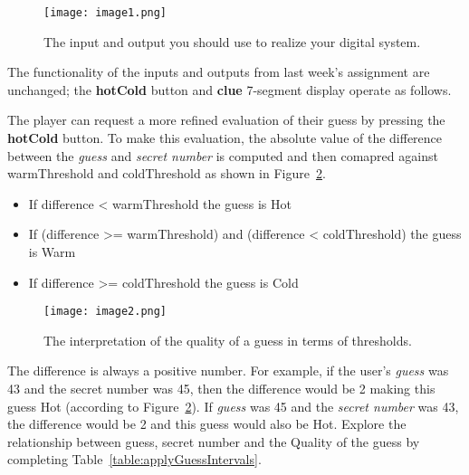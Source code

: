 \begin{figure}[ht]
\texttt{[image:  image1.png]}
\caption{The input and output you should use to realize your digital system.}
\label{fig:iOonDevBorad}
\end{figure}

The functionality of the inputs and outputs from last week's assignment
are unchanged; the \textbf{hotCold} button and \textbf{clue} 7-segment
display operate as follows.

The player can request a more refined evaluation of their guess by
pressing the \textbf{hotCold} button. To make this evaluation, the
absolute value of the difference between the \emph{guess} and
\emph{secret number} is computed and then comapred against warmThreshold
and coldThreshold as shown in Figure~\ref{fig:guessThreshold}.

\begin{itemize}
\item
  If difference \textless{} warmThreshold the guess is Hot
\item
  If (difference \textgreater= warmThreshold) and (difference
  \textless{} coldThreshold) the guess is Warm
\item
  If difference \textgreater= coldThreshold the guess is Cold
\end{itemize}

\begin{figure}[ht]
\texttt{[image:  image2.png]}
\caption{The interpretation of the quality of a guess in terms of thresholds.}
\label{fig:guessThreshold}
\end{figure}

The difference is always a positive number. For example, if the user's
\emph{guess} was 43 and the secret number was 45, then the difference
would be 2 making this guess Hot (according to Figure~\ref{fig:guessThreshold}). If
\emph{guess} was 45 and the \emph{secret number} was 43, the difference
would be 2 and this guess would also be Hot. Explore the relationship
between guess, secret number and the Quality of the guess by completing
Table~\ref{table:applyGuessIntervals}.

